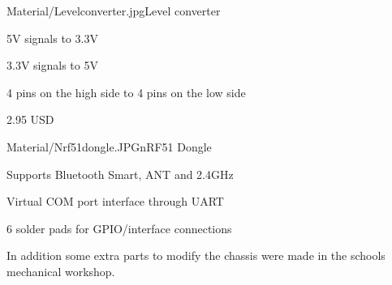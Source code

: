 \begin{material}{Material/Levelconverter.jpg}{Level converter}
\item 5V signals to 3.3V 
\item 3.3V signals to 5V
\item 4 pins on the high side to 4 pins on the low side
\item 2.95 USD
\end{material}

\begin{material}{Material/Nrf51dongle.JPG}{nRF51 Dongle}
\item Supports Bluetooth Smart, ANT and 2.4GHz
\item Virtual COM port interface through UART
\item 6 solder pads for GPIO/interface connections
\end{material}

In addition some extra parts to modify the chassis were made in the schools mechanical workshop.